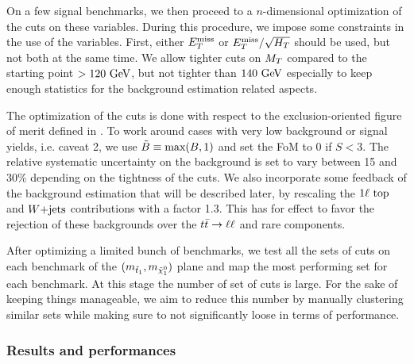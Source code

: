     On a few signal benchmarks, we then proceed to a $n$-dimensional optimization of the
    cuts on these variables. During this procedure, we impose some constraints in the use of the variables.
    First, either $E_T^\text{miss}$ or $E_T^\text{miss}/\sqrt{H_T}$ should be used, but not both at the same time.
    We allow tighter cuts on $M_T$ compared to the starting point $> 120~\text{GeV}$, but not
    tighter than $140~\text{GeV}$ especially to keep enough statistics for the background
    estimation related aspects.

    The optimization of the cuts is done with respect to the exclusion-oriented figure of
    merit defined in . To work around cases with very low background or signal yields,
    i.e. caveat 2, we use $\tilde{B} \equiv \text{max}(B,1)$ and set the FoM to 0
    if $S < 3$. The relative systematic uncertainty on the background is set to vary between
    15 and 30\% depending on the tightness of the cuts. We also incorporate some feedback
    of the background estimation that will be described later, by rescaling the $1\ell~\text{top}$
    and $\text{$W$+jets}$ contributions with a factor 1.3. This has for effect to favor the
    rejection of these backgrounds over the $t\bar{t} \rightarrow \ell \ell$ and rare components.

    After optimizing a limited bunch of benchmarks, we test all the sets of cuts on each
    benchmark of the $(m_{\tilde{t}_1},m_{\tilde{\chi}_1^0})$ plane and map the
    most performing set for each benchmark. At this stage the number of set of cuts is
    large. For the sake of keeping things manageable, we aim to reduce this number by
    manually clustering similar sets while making sure to not significantly loose in
    terms of performance.

        \subsubsection{Results and performances \label{sec:cutAndCountPerformances}}

